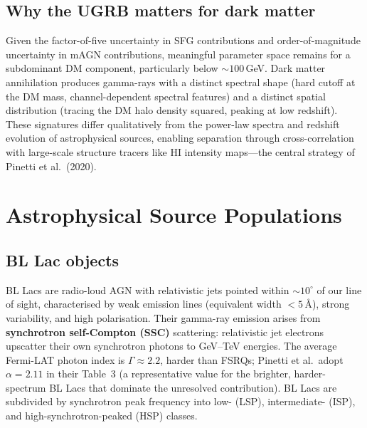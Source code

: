 \documentclass[10pt,a4paper]{article}
\begin{document}
\subsection{Why the UGRB matters for dark matter}

Given the factor-of-five uncertainty in SFG contributions and order-of-magnitude uncertainty in mAGN contributions, meaningful parameter space remains for a subdominant DM component, particularly below $\sim100$\,GeV. Dark matter annihilation produces gamma-rays with a distinct spectral shape (hard cutoff at the DM mass, channel-dependent spectral features) and a distinct spatial distribution (tracing the DM halo density squared, peaking at low redshift). These signatures differ qualitatively from the power-law spectra and redshift evolution of astrophysical sources, enabling separation through cross-correlation with large-scale structure tracers like HI intensity maps---the central strategy of Pinetti et al.\ (2020).


\section{Astrophysical Source Populations}
\label{sec:astro_sources}

\subsection{BL Lac objects}
\label{sec:bllac}

BL Lacs are radio-loud AGN with relativistic jets pointed within $\sim10^\circ$ of our line of sight, characterised by weak emission lines (equivalent width $< 5$\,\AA), strong variability, and high polarisation. Their gamma-ray emission arises from \textbf{synchrotron self-Compton (SSC)} scattering: relativistic jet electrons upscatter their own synchrotron photons to GeV--TeV energies. The average Fermi-LAT photon index is $\Gamma \approx 2.2$, harder than FSRQs; Pinetti et al.\ adopt $\alpha = 2.11$ in their Table~3 (a representative value for the brighter, harder-spectrum BL Lacs that dominate the unresolved contribution). BL Lacs are subdivided by synchrotron peak frequency into low- (LSP), intermediate- (ISP), and high-synchrotron-peaked (HSP) classes.
\end{document}
